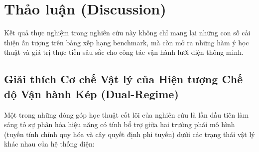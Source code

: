 \section{Thảo luận (Discussion)}
\label{sec:discussion}

Kết quả thực nghiệm trong nghiên cứu này không chỉ mang lại những con số cải thiện ấn tượng trên bảng xếp hạng benchmark, mà còn mở ra những hàm ý học thuật và giá trị thực tiễn sâu sắc cho công tác vận hành lưới điện thông minh.

\subsection{Giải thích Cơ chế Vật lý của Hiện tượng Chế độ Vận hành Kép (Dual-Regime)}
Một trong những đóng góp học thuật cốt lõi của nghiên cứu là lần đầu tiên làm sáng tỏ sự phân hóa hiệu năng có tính bổ trợ giữa hai trường phái mô hình (tuyến tính chính quy hóa và cây quyết định phi tuyến) dưới các trạng thái vật lý khác nhau của hệ thống điện:

